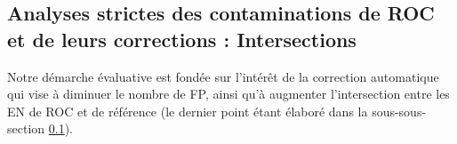 
%    

%    


\subsection{Analyses strictes des contaminations de ROC et de leurs corrections : Intersections}
\label{intersections}

Notre démarche évaluative est fondée sur l'intérêt de la correction automatique qui vise à diminuer le nombre de FP, ainsi qu'à augmenter l'intersection entre les EN de ROC et de référence (le dernier point étant élaboré dans la sous-sous-section \ref{intersections}). 


